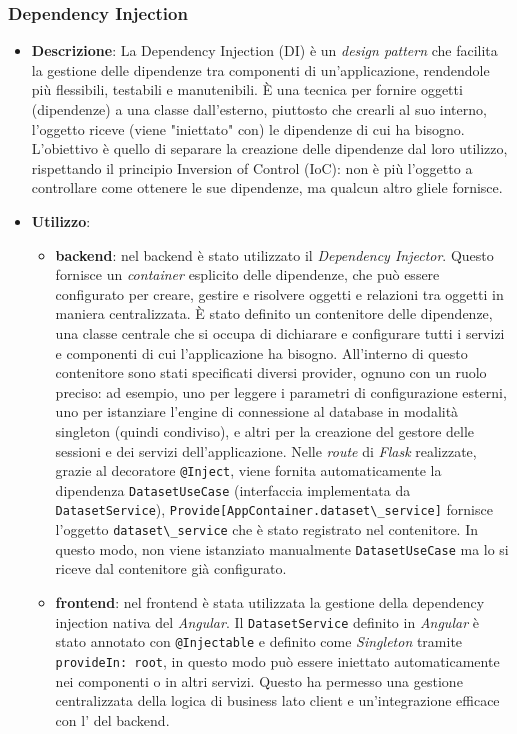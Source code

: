 \subsubsection{Dependency Injection}
\begin{itemize}
    \item \textbf{Descrizione}: La Dependency Injection (DI) è un \textit{design pattern} che facilita la gestione delle dipendenze tra componenti di un'applicazione, rendendole più flessibili, testabili e manutenibili.
    È una tecnica per fornire oggetti (dipendenze) a una classe dall’esterno, piuttosto che crearli al suo interno, l’oggetto riceve (viene "iniettato" con) le dipendenze di cui ha bisogno.
    L'obiettivo è quello di separare la creazione delle dipendenze dal loro utilizzo, rispettando il principio Inversion of Control (IoC): non è più l’oggetto a controllare come ottenere le sue dipendenze, ma qualcun altro gliele fornisce.
    \item \textbf{Utilizzo}: 
    \begin{itemize}
        \item \textbf{backend}: nel backend è stato utilizzato il  \textit{Dependency Injector}.
        Questo  fornisce un \textit{container} esplicito delle dipendenze, che può essere configurato per creare, gestire e risolvere oggetti e relazioni tra oggetti in maniera centralizzata.
        È stato definito un contenitore delle dipendenze, una classe centrale che si occupa di dichiarare e configurare tutti i servizi e componenti di cui l’applicazione ha bisogno.
        All'interno di questo contenitore sono stati specificati diversi provider, ognuno con un ruolo preciso: ad esempio, uno per leggere i parametri di configurazione esterni, uno per istanziare l’engine di connessione al database in modalità singleton (quindi condiviso), e altri per la creazione del gestore delle sessioni e dei servizi dell’applicazione.
        Nelle \textit{route} di \textit{Flask} realizzate, grazie al decoratore \lstinline|@Inject|, viene fornita automaticamente la dipendenza \lstinline|DatasetUseCase| (interfaccia implementata da \lstinline|DatasetService|),
        \lstinline|Provide[AppContainer.dataset\_service]| fornisce l'oggetto \lstinline|dataset\_service| che è stato registrato nel contenitore.
        In questo modo, non viene istanziato manualmente \lstinline|DatasetUseCase| ma lo si riceve dal contenitore già configurato.
        \item \textbf{frontend}: nel frontend è stata utilizzata la gestione della dependency injection nativa del  \textit{Angular}.
        Il \lstinline|DatasetService| definito in \textit{Angular} è stato annotato con \lstinline|@Injectable| e definito come \textit{Singleton} tramite \lstinline|provideIn: root|, in questo modo può essere iniettato automaticamente nei componenti o in altri servizi. 
        Questo ha permesso una gestione centralizzata della logica di business lato client e un’integrazione efficace con l’ del backend. 
    \end{itemize}
\end{itemize}

